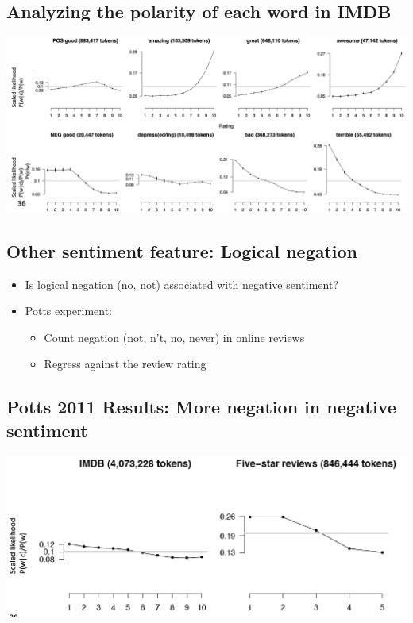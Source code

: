 \documentclass[11pt]{article}
\theoremstyle{definition}
\begin{document}
\subsection{Analyzing the polarity of each word in IMDB}
\includegraphics[width=\textwidth]{16.png}

\subsection{Other sentiment feature: Logical negation}
\begin{itemize}
  \item Is logical negation (no, not) associated with negative
  sentiment?
  \item Potts experiment:
  \begin{itemize}
    \item Count negation (not, n’t, no, never) in online reviews
    \item Regress against the review rating
  \end{itemize}
\end{itemize}

\subsection{Potts 2011 Results: More negation in negative sentiment}
\includegraphics[width=\textwidth]{17.png}
\end{document}
